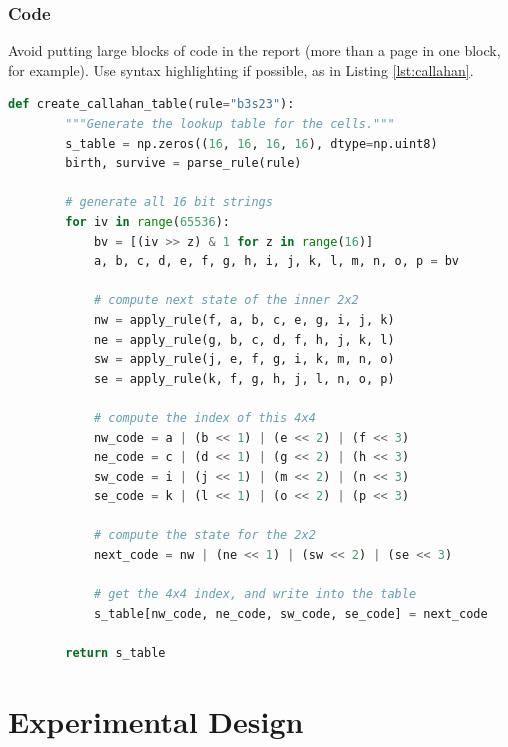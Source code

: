 \documentclass{l4proj}
\begin{document}
\subsection{Code}

Avoid putting large blocks of code in the report (more than a page in one block, for example). Use syntax highlighting if possible, as in Listing \ref{lst:callahan}.

\begin{lstlisting}[language=python, float, caption={The algorithm for packing the $3\times 3$ outer-totalistic binary CA successor rule into a 
    $16\times 16\times 16\times 16$ 4 bit lookup table, running an equivalent, notionally 16-state $2\times 2$ CA.}, label=lst:callahan]
    def create_callahan_table(rule="b3s23"):
        """Generate the lookup table for the cells."""        
        s_table = np.zeros((16, 16, 16, 16), dtype=np.uint8)
        birth, survive = parse_rule(rule)

        # generate all 16 bit strings
        for iv in range(65536):
            bv = [(iv >> z) & 1 for z in range(16)]
            a, b, c, d, e, f, g, h, i, j, k, l, m, n, o, p = bv

            # compute next state of the inner 2x2
            nw = apply_rule(f, a, b, c, e, g, i, j, k)
            ne = apply_rule(g, b, c, d, f, h, j, k, l)
            sw = apply_rule(j, e, f, g, i, k, m, n, o)
            se = apply_rule(k, f, g, h, j, l, n, o, p)

            # compute the index of this 4x4
            nw_code = a | (b << 1) | (e << 2) | (f << 3)
            ne_code = c | (d << 1) | (g << 2) | (h << 3)
            sw_code = i | (j << 1) | (m << 2) | (n << 3)
            se_code = k | (l << 1) | (o << 2) | (p << 3)

            # compute the state for the 2x2
            next_code = nw | (ne << 1) | (sw << 2) | (se << 3)

            # get the 4x4 index, and write into the table
            s_table[nw_code, ne_code, sw_code, se_code] = next_code

        return s_table

\end{lstlisting}


\chapter{Experimental Design}
\end{document}
